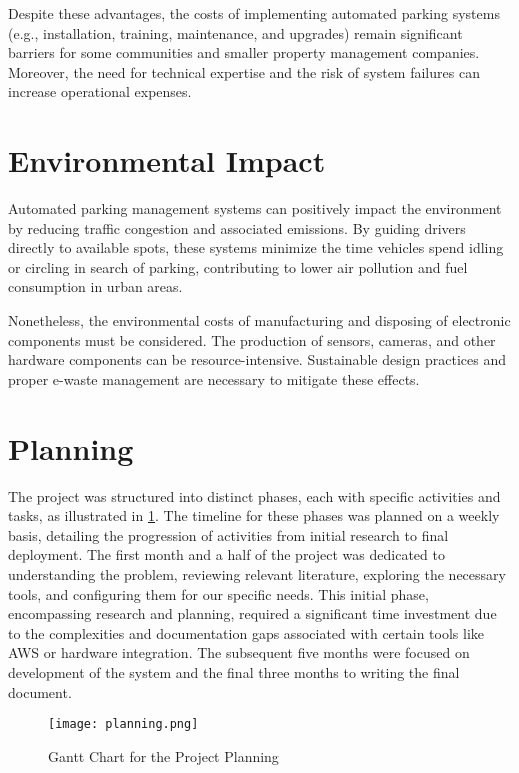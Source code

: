 Despite these advantages, the costs of implementing automated parking systems (e.g., installation, training, maintenance, and upgrades) remain significant barriers for some communities and smaller property management companies. Moreover, the need for technical expertise and the risk of system failures can increase operational expenses.

\section{Environmental Impact}

Automated parking management systems can positively impact the environment by reducing traffic congestion and associated emissions. By guiding drivers directly to available spots, these systems minimize the time vehicles spend idling or circling in search of parking, contributing to lower air pollution and fuel consumption in urban areas.

Nonetheless, the environmental costs of manufacturing and disposing of electronic components must be considered. The production of sensors, cameras, and other hardware components can be resource-intensive. Sustainable design practices and proper e-waste management are necessary to mitigate these effects.

\section{Planning}

The project was structured into distinct phases, each with specific activities and tasks, as illustrated in \cref{fig:planning}. The timeline for these phases was planned on a weekly basis, detailing the progression of activities from initial research to final deployment. The first month and a half of the project was dedicated to understanding the problem, reviewing relevant literature, exploring the necessary tools, and configuring them for our specific needs. This initial phase, encompassing research and planning, required a significant time investment due to the complexities and documentation gaps associated with certain tools like AWS or hardware integration. The subsequent five months were focused on development of the system and the final three months to writing the final document.

\begin{figure}
    \texttt{[image: planning.png]}
    \caption{Gantt Chart for the Project Planning}\label{fig:planning}
\end{figure}

